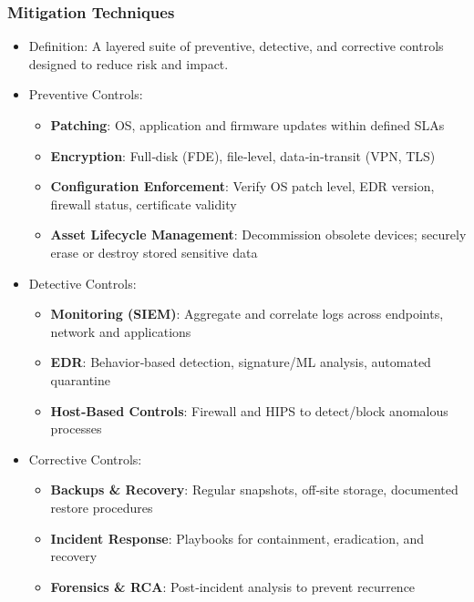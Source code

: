\documentclass[11pt]{article}
\begin{document}
\subsubsection{Mitigation Techniques}
\label{sec:org93fc6fe}
\begin{itemize}
\item Definition: A layered suite of preventive, detective, and corrective controls designed to reduce risk and impact.
\item Preventive Controls:
\begin{itemize}
\item \textbf{Patching}: OS, application and firmware updates within defined SLAs
\item \textbf{Encryption}: Full‑disk (FDE), file‑level, data‑in‑transit (VPN, TLS)
\item \textbf{\textbf{Configuration Enforcement}}: Verify OS patch level, EDR version, firewall status, certificate validity
\item \textbf{\textbf{Asset Lifecycle Management}}: Decommission obsolete devices; securely erase or destroy stored sensitive data
\end{itemize}
\item Detective Controls:
\begin{itemize}
\item \textbf{\textbf{Monitoring (SIEM)}}: Aggregate and correlate logs across endpoints, network and applications
\item \textbf{\textbf{EDR}}: Behavior‑based detection, signature/ML analysis, automated quarantine
\item \textbf{\textbf{Host‑Based Controls}}: Firewall and HIPS to detect/block anomalous processes
\end{itemize}
\item Corrective Controls:
\begin{itemize}
\item \textbf{\textbf{Backups \& Recovery}}: Regular snapshots, off‑site storage, documented restore procedures
\item \textbf{\textbf{Incident Response}}: Playbooks for containment, eradication, and recovery
\item \textbf{\textbf{Forensics \& RCA}}: Post‑incident analysis to prevent recurrence
\end{itemize}
\end{itemize}
\end{document}
